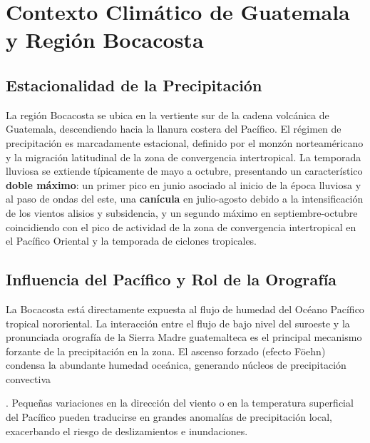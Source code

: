 \documentclass[titlepage,11pt]{report}
\begin{document}
\section{Contexto Climático de Guatemala y Región Bocacosta}

\subsection{Estacionalidad de la Precipitación}
La región Bocacosta se ubica en la vertiente sur de la cadena volcánica de Guatemala, descendiendo hacia la llanura costera del Pacífico. El régimen de precipitación es marcadamente estacional, definido por el monzón norteaméricano y la migración latitudinal de la zona de convergencia intertropical. La temporada lluviosa se extiende típicamente de mayo a octubre, presentando un característico \textbf{doble máximo}: un primer pico en junio asociado al inicio de la época lluviosa y al paso de ondas del este, una \textbf{canícula} en julio-agosto debido a la intensificación de los vientos alisios y subsidencia, y un segundo máximo en septiembre-octubre coincidiendo con el pico de actividad de la zona de convergencia intertropical en el Pacífico Oriental y la temporada de ciclones tropicales.

\subsection{Influencia del Pacífico y Rol de la Orografía}
La Bocacosta está directamente expuesta al flujo de humedad del Océano Pacífico tropical nororiental. La interacción entre el flujo de bajo nivel del suroeste y la pronunciada orografía de la Sierra Madre guatemalteca es el principal mecanismo forzante de la precipitación en la zona. El ascenso forzado (efecto Föehn) condensa la abundante humedad oceánica, generando núcleos de precipitación convectiva . Pequeñas variaciones en la dirección del viento o en la temperatura superficial del Pacífico pueden traducirse en grandes anomalías de precipitación local, exacerbando el riesgo de deslizamientos e inundaciones.
\end{document}

